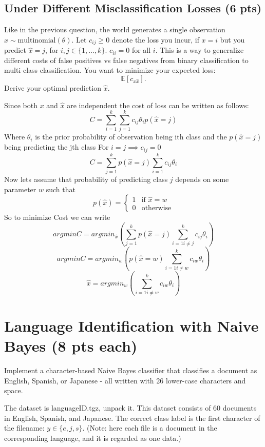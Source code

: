 \documentclass[a4paper]{article}
\theoremstyle{definition}
\def\E{\mathbb E}
\newenvironment{soln}{
    \leavevmode\color{blue}\ignorespaces
}{}
\begin{document}
\subsection{Under Different Misclassification Losses (6 pts)}
Like in the previous question, the world generates a single observation $x \sim \mbox{multinomial}(\theta)$. Let $c_{ij} \ge 0$ denote the loss you incur, if $x=i$ but you predict $\hat x=j$, for $i,j \in \{1, \ldots, k\}$.
$c_{ii}=0$ for all $i$. This is a way to generalize different costs of false positives vs false negatives from binary classification to multi-class classification. You want to minimize your expected loss:
$$\E[c_{x \hat x}].$$
Derive your optimal prediction $\hat x$.
\begin{soln}
    Since both $x$ and $\hat x$ are independent the cost of loss can be written as follows:
    $$
    C = \sum_{i=1}^k\sum_{j=1}^k c_{ij}\theta_i p(\hat x=j)
    $$
    Where $\theta_i$ is the prior probability of observation being ith class and the $p(\hat x=j)$ being predicting the jth class
    For $i=j \implies c_{ij}=0$
    $$
    C=\sum_{j=1}^k p(\hat x=j)\sum_{i=1}^k c_{ij}\theta_i
    $$
    Now lets assume that probability of predicting class $j$ depends on some parameter  $w$ such that
    \begin{equation}
p(\hat x ) = 
    \begin{cases}
        1 & \text{if } \hat x =w\\
        0 & \text{otherwise}
    \end{cases}
\end{equation}
So to minimize Cost we can write 
$$
argmin C = argmin _{\hat x} (\sum_{j=1}^k p(\hat x = j)\sum_{i=1 i\neq j}^k c_{ij} \theta_i)
$$
$$
argmin C = argmin _{w }(p(\hat x = w)\sum_{i=1 i\neq w}^k c_{iw}\theta_i)
$$
$$
\hat x = argmin _w(\sum_{i=1 i\neq w}^k c_{iw} \theta_i)
$$
\end{soln}
\section{Language Identification with Naive Bayes (8 pts each)}
Implement a character-based Naive Bayes classifier that classifies a document as English, Spanish, or Japanese - all written with 26 lower-case characters and space.

The dataset is languageID.tgz, unpack it. This dataset consists of 60 documents in English, Spanish, and Japanese. The correct class label is the first character of the filename: $y \in \{e, j, s\}$. (Note: here each file is a document in the corresponding language, and it is regarded as one data.)
\end{document}
